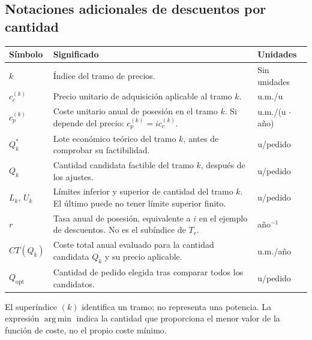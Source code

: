 \documentclass[11pt,a4paper]{article}
\begin{document}
\subsection{Notaciones adicionales de descuentos por cantidad}
\begin{longtable}{@{}p{2cm}p{8cm}p{3.5cm}@{}}
    \toprule
    Símbolo            & Significado                                                                                             & Unidades             \\
    \midrule
    \endhead
    $k$                & Índice del tramo de precios.                                                                            & Sin unidades         \\
    $c_c^{(k)}$        & Precio unitario de adquisición aplicable al tramo $k$.                                                  & u.m./u               \\
    $c_p^{(k)}$        & Coste unitario anual de posesión en el tramo $k$. Si depende del precio: $c_p^{(k)}=i c_c^{(k)}$.       & u.m./(u $\cdot$ año) \\
    $Q_k^{*}$          & Lote económico teórico del tramo $k$, antes de comprobar su factibilidad.                               & u/pedido             \\
    $Q_k$              & Cantidad candidata factible del tramo $k$, después de los ajustes.                                      & u/pedido             \\
    $L_k$, $U_k$       & Límites inferior y superior de cantidad del tramo $k$. El último puede no tener límite superior finito. & u/pedido             \\
    $r$                & Tasa anual de posesión, equivalente a $i$ en el ejemplo de descuentos. No es el subíndice de $T_r$.     & año$^{-1}$           \\
    $CT(Q_k)$          & Coste total anual evaluado para la cantidad candidata $Q_k$ y su precio aplicable.                      & u.m./año             \\
    $Q_{\mathrm{opt}}$ & Cantidad de pedido elegida tras comparar todos los candidatos.                                          & u/pedido             \\
    \bottomrule
\end{longtable}
El superíndice $(k)$ identifica un tramo; no representa una potencia. La expresión $\operatorname*{arg\,min}$ indica la cantidad que proporciona el menor valor de la función de coste, no el propio coste mínimo.
\end{document}
